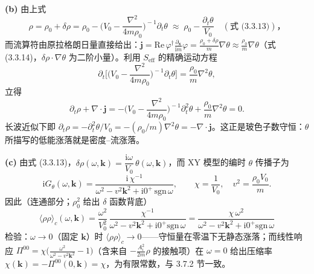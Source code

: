 \textbf{(b)} 由上式
\begin{equation*}
\rho=\rho_0+\delta\rho=\rho_0-\Big(V_0-\frac{\nabla^{2}}{4m\rho_0}\Big)^{\!-1}\partial_t\theta
\;\approx\;\rho_0-\frac{\partial_t\theta}{V_0}
\quad(\text{式 (3.3.13)})，
\end{equation*}
而流算符由原拉格朗日量直接给出：$\pmb{j}=\mathrm{Re}\,\varphi^{\dagger}\frac{\partial_{\pmb{x}}}{\mathrm{i}m}\varphi
=\frac{\rho_0+\delta\rho}{m}\nabla\theta\approx\frac{\rho_0}{m}\nabla\theta$（式 (3.3.14)，$\delta\rho\cdot\nabla\theta$ 为二阶小量）。利用 $S_{\mathrm{eff}}$ 的精确运动方程
\begin{equation*}
\partial_t\Big[\Big(V_0-\frac{\nabla^{2}}{4m\rho_0}\Big)^{\!-1}\partial_t\theta\Big]
=\frac{\rho_0}{m}\nabla^{2}\theta ,
\end{equation*}
立得
\begin{equation*}
\partial_t\rho+\nabla\cdot\pmb{j}
=-\Big(V_0-\frac{\nabla^{2}}{4m\rho_0}\Big)^{\!-1}\partial_t^{2}\theta+\frac{\rho_0}{m}\nabla^{2}\theta=0 .
\end{equation*}
长波近似下即 $\partial_t\rho=-\partial_t^{2}\theta/V_0=-(\rho_0/m)\nabla^{2}\theta=-\nabla\cdot\pmb{j}$。这正是玻色子数守恒：$\theta$ 所描写的低能涨落就是密度--流涨落。

\textbf{(c)} 由式 (3.3.13)，$\delta\rho(\omega,\pmb{k})=\dfrac{\mathrm{i}\omega}{V_0}\,\theta(\omega,\pmb{k})$，而 XY 模型的编时 $\theta$ 传播子为
\begin{equation*}
\mathrm{i}G_\theta(\omega,\pmb{k})=\frac{\mathrm{i}\,\chi^{-1}}{\omega^{2}-v^{2}\pmb{k}^{2}+\mathrm{i}0^{+}\,\mathrm{sgn}\,\omega},
\qquad \chi=\frac1{V_0},\quad v^{2}=\frac{\rho_0V_0}{m} .
\end{equation*}
因此（连通部分；$\rho_0^{2}$ 给出 $\delta$ 函数背底）
\begin{equation*}
\boxed{\;\langle\rho\rho\rangle_c(\omega,\pmb{k})
=\frac{\omega^{2}}{V_0^{2}}\,\frac{\chi^{-1}}{\omega^{2}-v^{2}\pmb{k}^{2}+\mathrm{i}0^{+}\mathrm{sgn}\,\omega}
=\frac{\chi\,\omega^{2}}{\omega^{2}-v^{2}\pmb{k}^{2}+\mathrm{i}0^{+}\mathrm{sgn}\,\omega}\;}
\end{equation*}
检验：$\omega\to0$（固定 $\pmb{k}$）时 $\langle\rho\rho\rangle_c\to0$——守恒量在零温下无静态涨落；而线性响应 $\Pi^{00}=\chi\big(\frac{\omega^{2}}{\omega^{2}-v^{2}\pmb{k}^{2}}-1\big)$（含来自 $-\frac{A_i^{2}}{2m}\rho$ 的接触项）在 $\omega=0$ 给出压缩率 $\chi(\pmb{k})=-\Pi^{00}(0,\pmb{k})=\chi$，为有限常数，与 3.7.2 节一致。

